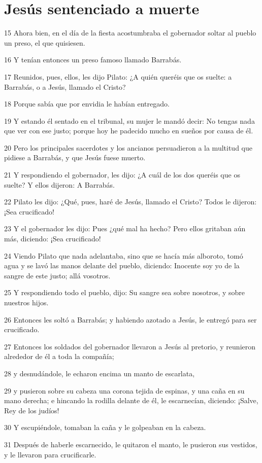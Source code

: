 \section*{Jesús sentenciado a muerte}

\par 15 Ahora bien, en el día de la fiesta acostumbraba el gobernador soltar al pueblo un preso, el que quisiesen.
\par 16 Y tenían entonces un preso famoso llamado Barrabás.
\par 17 Reunidos, pues, ellos, les dijo Pilato: ¿A quién queréis que os suelte: a Barrabás, o a Jesús, llamado el Cristo?
\par 18 Porque sabía que por envidia le habían entregado.
\par 19 Y estando él sentado en el tribunal, su mujer le mandó decir: No tengas nada que ver con ese justo; porque hoy he padecido mucho en sueños por causa de él.
\par 20 Pero los principales sacerdotes y los ancianos persuadieron a la multitud que pidiese a Barrabás, y que Jesús fuese muerto.
\par 21 Y respondiendo el gobernador, les dijo: ¿A cuál de los dos queréis que os suelte? Y ellos dijeron: A Barrabás.
\par 22 Pilato les dijo: ¿Qué, pues, haré de Jesús, llamado el Cristo? Todos le dijeron: ¡Sea crucificado!
\par 23 Y el gobernador les dijo: Pues ¿qué mal ha hecho? Pero ellos gritaban aún más, diciendo: ¡Sea crucificado!
\par 24 Viendo Pilato que nada adelantaba, sino que se hacía más alboroto, tomó agua y se lavó las manos delante del pueblo, diciendo: Inocente soy yo de la sangre de este justo; allá vosotros.
\par 25 Y respondiendo todo el pueblo, dijo: Su sangre sea sobre nosotros, y sobre nuestros hijos.
\par 26 Entonces les soltó a Barrabás; y habiendo azotado a Jesús, le entregó para ser crucificado.
\par 27 Entonces los soldados del gobernador llevaron a Jesús al pretorio, y reunieron alrededor de él a toda la compañía;
\par 28 y desnudándole, le echaron encima un manto de escarlata,
\par 29 y pusieron sobre su cabeza una corona tejida de espinas, y una caña en su mano derecha; e hincando la rodilla delante de él, le escarnecían, diciendo: ¡Salve, Rey de los judíos!
\par 30 Y escupiéndole, tomaban la caña y le golpeaban en la cabeza.
\par 31 Después de haberle escarnecido, le quitaron el manto, le pusieron sus vestidos, y le llevaron para crucificarle.

